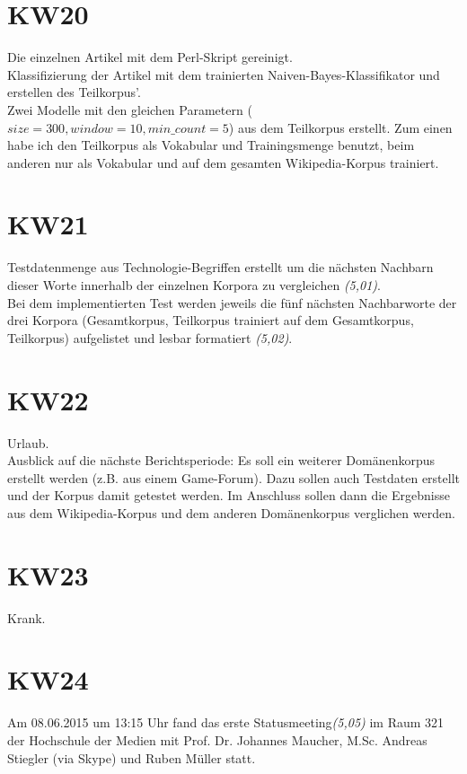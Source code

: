 \documentclass[11pt,a4paper]{article}
\begin{document}
\section*{KW20}
Die einzelnen Artikel mit dem Perl-Skript gereinigt.
\\Klassifizierung der Artikel mit dem trainierten Naiven-Bayes-Klassifikator und erstellen des Teilkorpus'.
\\Zwei Modelle mit den gleichen Parametern ($size=300, window=10, min\_count=5$) aus dem Teilkorpus erstellt. Zum einen habe ich den Teilkorpus als Vokabular und Trainingsmenge benutzt, beim anderen nur als Vokabular und auf dem gesamten Wikipedia-Korpus trainiert.

\section*{KW21}
Testdatenmenge aus Technologie-Begriffen erstellt um die nächsten Nachbarn dieser Worte innerhalb der einzelnen Korpora zu vergleichen \textit{(5,01)}.
\\Bei dem implementierten Test werden jeweils die fünf nächsten Nachbarworte der drei Korpora (Gesamtkorpus, Teilkorpus trainiert auf dem Gesamtkorpus, Teilkorpus) aufgelistet und lesbar formatiert \textit{(5,02)}.
\\

\section*{KW22}
Urlaub.\\

Ausblick auf die nächste Berichtsperiode:
Es soll ein weiterer Domänenkorpus erstellt werden (z.B. aus einem Game-Forum). Dazu sollen auch Testdaten erstellt und der Korpus damit getestet werden. Im Anschluss sollen dann die Ergebnisse aus dem Wikipedia-Korpus und dem anderen Domänenkorpus verglichen werden.


\section*{KW23}
Krank.

\section*{KW24}
Am 08.06.2015 um 13:15 Uhr fand das erste Statusmeeting\textit{(5,05)} im Raum 321 der Hochschule der Medien  mit Prof. Dr. Johannes Maucher, M.Sc. Andreas Stiegler (via Skype) und Ruben Müller statt.\\
\end{document}
